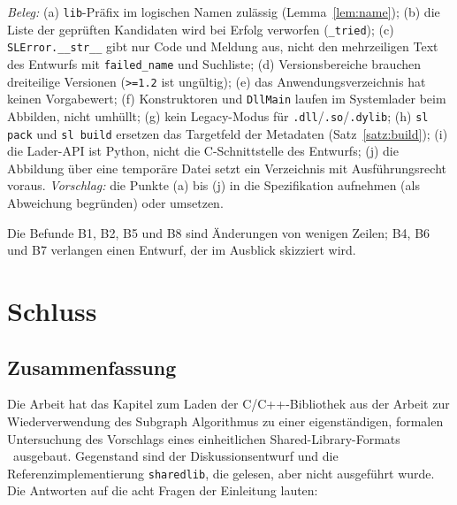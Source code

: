 \begin{befund}
	\label{bef:abw}
	\emph{Beleg:} (a) \texttt{lib}-Präfix im logischen Namen zulässig (Lemma~\ref{lem:name}); (b) die Liste der geprüften Kandidaten wird bei Erfolg verworfen (\texttt{\_tried}); (c) \texttt{SLError.\_\_str\_\_} gibt nur Code und Meldung aus, nicht den mehrzeiligen Text des Entwurfs mit \texttt{failed\_name} und Suchliste; (d) Versionsbereiche brauchen dreiteilige Versionen (\texttt{>=1.2} ist ungültig); (e) das Anwendungsverzeichnis hat keinen Vorgabewert; (f) Konstruktoren und \texttt{DllMain} laufen im Systemlader beim Abbilden, nicht umhüllt; (g) kein Legacy-Modus für \texttt{.dll}/\texttt{.so}/\texttt{.dylib}; (h) \texttt{sl pack} und \texttt{sl build} ersetzen das Targetfeld der Metadaten (Satz~\ref{satz:build}); (i) die Lader-API ist Python, nicht die C-Schnittstelle des Entwurfs; (j) die Abbildung über eine temporäre Datei setzt ein Verzeichnis mit Ausführungsrecht voraus. \emph{Vorschlag:} die Punkte (a) bis (j) in die Spezifikation aufnehmen (als Abweichung begründen) oder umsetzen.
\end{befund}

Die Befunde B1, B2, B5 und B8 sind Änderungen von wenigen Zeilen; B4, B6 und B7 verlangen einen Entwurf, der im Ausblick skizziert wird.

\part{Schluss}

\chapter{Zusammenfassung}
\label{chap:zusammenfassung}

Die Arbeit hat das Kapitel zum Laden der C/C++-Bibliothek aus der Arbeit zur Wiederverwendung des Subgraph Algorithmus zu einer eigenständigen, formalen Untersuchung des Vorschlags eines einheitlichen Shared-Library-Formats \SL\ ausgebaut. Gegenstand sind der Diskussionsentwurf und die Referenzimplementierung \texttt{sharedlib}, die gelesen, aber nicht ausgeführt wurde. Die Antworten auf die acht Fragen der Einleitung lauten:

